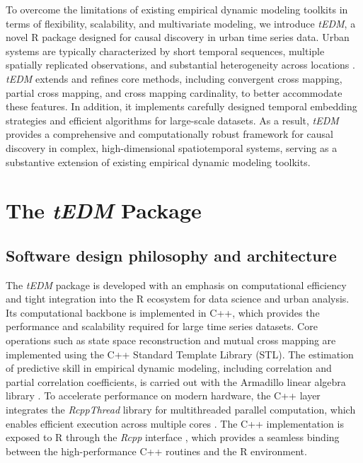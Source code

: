 \documentclass[authoryear,preprint,review,12pt]{elsarticle}
\begin{document}
To overcome the limitations of existing empirical dynamic modeling toolkits in terms of flexibility, scalability, and multivariate modeling, we introduce \textit{tEDM}, a novel R package designed for causal discovery in urban time series data. Urban systems are typically characterized by short temporal sequences, multiple spatially replicated observations, and substantial heterogeneity across locations \citep{gan2025urban_transfer_entropy,mao2024urban_traffic_networks}. \textit{tEDM} extends and refines core methods, including convergent cross mapping, partial cross mapping, and cross mapping cardinality, to better accommodate these features. In addition, it implements carefully designed temporal embedding strategies and efficient algorithms for large-scale datasets. As a result, \textit{tEDM} provides a comprehensive and computationally robust framework for causal discovery in complex, high-dimensional spatiotemporal systems, serving as a substantive extension of existing empirical dynamic modeling toolkits.

\section{The \textit{tEDM} Package}\label{sec_pkg}

\subsection{Software design philosophy and architecture}

The \textit{tEDM} package is developed with an emphasis on computational efficiency and tight integration into the R ecosystem for data science and urban analysis. Its computational backbone is implemented in C++, which provides the performance and scalability required for large time series datasets. Core operations such as state space reconstruction and mutual cross mapping are implemented using the C++ Standard Template Library (STL). The estimation of predictive skill in empirical dynamic modeling, including correlation and partial correlation coefficients, is carried out with the Armadillo linear algebra library \citep{armadillo}. To accelerate performance on modern hardware, the C++ layer integrates the \textit{RcppThread} library for multithreaded parallel computation, which enables efficient execution across multiple cores \citep{rcppthread}. The C++ implementation is exposed to R through the \textit{Rcpp} interface \citep{rcpp}, which provides a seamless binding between the high-performance C++ routines and the R environment.
\end{document}
